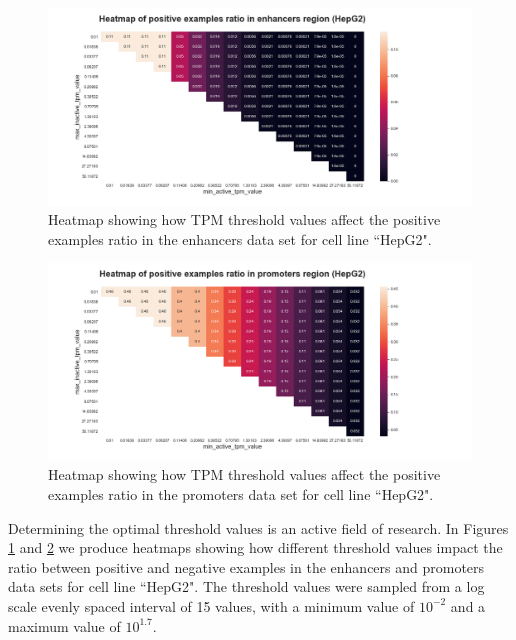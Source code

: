 \documentclass{article}
\begin{document}
\begin{figure}
    \centering
    \includegraphics[width=\textwidth]{img/heatmap_HepG2_enhancers.png}
    \caption{Heatmap showing how TPM threshold values affect the positive examples ratio in the enhancers data set for cell line  “HepG2".}
    \label{fig:exp:heatmap_tpm_enh}
\end{figure}

\begin{figure}
    \centering
    \includegraphics[width=\textwidth]{img/heatmap_HepG2_promoters.png}
    \caption{Heatmap showing how TPM threshold values affect the positive examples ratio in the promoters data set for cell line  “HepG2".}
    \label{fig:exp:heatmap_tpm_prom}
\end{figure}

Determining the optimal threshold values is an active field of research. In Figures \ref{fig:exp:heatmap_tpm_enh} and \ref{fig:exp:heatmap_tpm_prom} we produce heatmaps showing how different threshold values impact the ratio between positive and negative examples in the enhancers and promoters data sets for cell line  “HepG2". The threshold values were sampled from a log scale evenly spaced interval of 15 values, with a minimum value of $10^{-2}$ and a maximum value of $10^{1.7}$.
\end{document}
